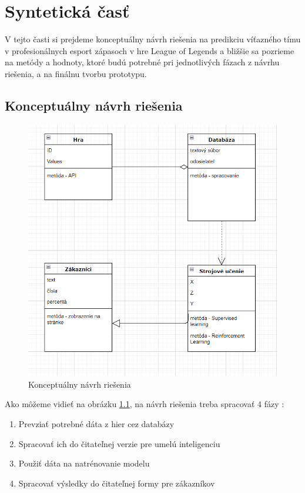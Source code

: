
\chapter{Syntetická časť}
\label{methodology}
V tejto časti si prejdeme konceptuálny návrh riešenia na predikciu víťazného tímu v profesionálnych esport zápasoch v hre League of Legends a bližšie sa pozrieme na metódy a hodnoty, ktoré budú potrebné pri jednotlivých fázach z návrhu riešenia, a na finálnu tvorbu prototypu. 
\section{Konceptuálny návrh riešenia}

 \begin{figure}[ht!]
	
	\includegraphics[width=.9\textwidth]{figures/navrhriesenia}
	\centering
	\caption{ Konceptuálny návrh riešenia \label{koncept}}
	
\end{figure}

Ako môžeme vidieť na obrázku \ref{koncept}, na návrh riešenia treba spracovať 4 fázy : 

\begin{enumerate}
	\item Prevziať potrebné dáta z hier cez databázy
	\item Spracovať ich do čitateľnej verzie pre umelú inteligenciu
	\item Použiť dáta na natrénovanie modelu
	\item Spracovať výsledky do čitateľnej formy pre zákazníkov
\end{enumerate}

